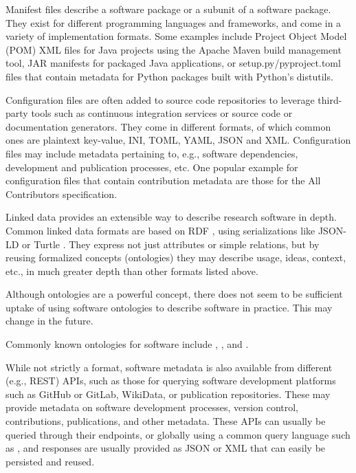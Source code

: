 \documentclass{article}
\begin{document}
\label{subsubsec:metadata-formats-manifests}
Manifest files describe a software package or a subunit of a software package. They exist for different programming languages and frameworks, and come in a variety of implementation formats. Some examples include Project Object Model (POM) XML files for Java projects using the Apache Maven build management tool, JAR manifests for packaged Java applications, or setup.py/pyproject.toml files that contain metadata for Python packages built with Python’s distutils.



\label{subsubsec:metadata-formats-config}
Configuration files are often added to source code repositories to leverage third-party tools such as continuous integration services or source code or documentation generators. They come in different formats, of which common ones are plaintext key-value, INI, TOML, YAML, JSON and XML. Configuration files may include metadata pertaining to, e.g., software dependencies, development and publication processes, etc. One popular example for configuration files that contain contribution metadata are those for the All Contributors specification.



\label{subsubsec:metadata-formats-linked-data}
Linked data provides an extensible way to describe research software in depth. Common linked data formats are based on RDF \cite{11045035/RZXJXX75}, using serializations like JSON-LD \cite{11045035/DQRH6UQP} or Turtle \cite{11045035/F3ARKWX4}. They express not just attributes or simple relations, but by reusing formalized concepts (ontologies) they may describe usage, ideas, context, etc., in much greater depth than other formats listed above.

Although ontologies are a powerful concept, there does not seem to be sufficient uptake of using software ontologies to describe software in practice. This may change in the future.

Commonly known ontologies for software include \cite{11045035/TVVPYY5L}, \cite{11045035/5JK345NF}, \cite{11045035/A8V7DJ4R} and \cite{11045035/YPMVLAM4}.



\label{subsubsec:metadata-formats-apis}
While not strictly a format, software metadata is also available from different (e.g., REST) APIs, such as those for querying software development platforms such as GitHub or GitLab, WikiData, or publication repositories. These may provide metadata on software development processes, version control, contributions, publications, and other metadata. These APIs can usually be queried through their endpoints, or globally using a common query language such as \cite{138880/D5YC8HI5}, and responses are usually provided as JSON or XML that can easily be persisted and reused.
\end{document}
